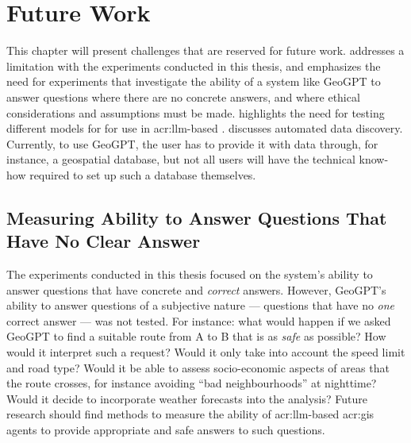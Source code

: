 \chapter{Future Work}
\label{cha:future-work}

\begin{comment}
Consider where you would like to extend or improve this work, or how somebody else could continue it.
These extensions might either be continuing the ongoing direction or taking a side direction that became obvious during the work.
Further, possible solutions to limitations in the work conducted, highlighted in Section~\ref{sec:discussion} may be presented.

Note that in the Specialisation Project Report, the Future Work section will be a key part of your plan for the novel work to be carried out in the next semester,
while in the Master's Thesis, the Future Work section rather will point to issues that others might be interested in addressing.
This can include options and alternatives that you did not try out yourself, or potential improvements and extensions to your experiments or system.
\end{comment}

This chapter will present challenges that are reserved for future work.  addresses a limitation with the experiments conducted in this thesis, and emphasizes the need for experiments that investigate the ability of a system like GeoGPT to answer questions where there are no concrete answers, and where ethical considerations and assumptions must be made.  highlights the need for testing different models for for use in \acrshort{acr:llm}-based .  discusses automated data discovery. Currently, to use GeoGPT, the user has to provide it with data through, for instance, a geospatial database, but not all users will have the technical know-how required to set up such a database themselves.

\section{Measuring Ability to Answer Questions That Have No Clear Answer}
\label{sec:no-clear-answer}

The experiments conducted in this thesis focused on the system's ability to answer questions that have concrete and \textit{correct} answers. However, GeoGPT's ability to answer questions of a subjective nature --- questions that have no \textit{one} correct answer --- was not tested. For instance: what would happen if we asked GeoGPT to find a suitable route from A to B that is as \textit{safe} as possible? How would it interpret such a request? Would it only take into account the speed limit and road type? Would it be able to assess socio-economic aspects of areas that the route crosses, for instance avoiding \enquote{bad neighbourhoods} at nighttime? Would it decide to incorporate weather forecasts into the analysis? Future research should find methods to measure the ability of \acrshort{acr:llm}-based \acrshort{acr:gis} agents to provide appropriate and safe answers to such questions.

